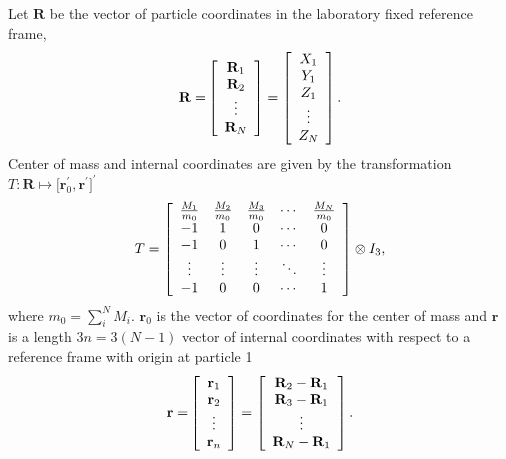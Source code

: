 \documentclass[12pt]{article}
\begin{document}
Let $\mathbf{R}$ be the vector of particle coordinates in the laboratory fixed
reference frame,
\begin{equation}
\mathbf{R=}\left[
\begin{array}
[c]{c}%
\mathbf{R}_{1}\\
\mathbf{R}_{2}\\
\vdots\\
\mathbf{R}_{N}%
\end{array}
\right]  =\left[
\begin{array}
[c]{c}%
X_{1}\\
Y_{1}\\
Z_{1}\\
\vdots\\
Z_{N}%
\end{array}
\right]  .
\end{equation}
Center of mass and internal coordinates are given by the transformation
$T:\mathbf{R}\mapsto\lbrack\mathbf{r}_{0}^{\prime},\mathbf{r}^{\prime
}]^{\prime}$
\begin{equation}
T=\left[
\begin{array}
[c]{ccccc}%
\frac{M_{1}}{m_{0}} & \frac{M_{2}}{m_{0}} & \frac{M_{3}}{m_{0}} & \cdots &
\frac{M_{N}}{m_{0}}\\
-1 & 1 & 0 & \cdots & 0\\
-1 & 0 & 1 & \cdots & 0\\
\vdots & \vdots & \vdots & \ddots & \vdots\\
-1 & 0 & 0 & \cdots & 1
\end{array}
\right]  \otimes I_{3},\label{Ttran}%
\end{equation}
where $m_{0}=\sum_{i}^{N}M_{i}$. $\mathbf{r}_{0}$ is the vector of coordinates
for the center of mass and $\mathbf{r}$ is a length $3n=3\left(  N-1\right)  $
vector of internal coordinates with respect to a reference frame with origin
at particle 1
\begin{equation}
\mathbf{r=}\left[
\begin{array}
[c]{c}%
\mathbf{r}_{1}\\
\mathbf{r}_{2}\\
\vdots\\
\mathbf{r}_{n}%
\end{array}
\right]  =\left[
\begin{array}
[c]{c}%
\mathbf{R}_{2}-\mathbf{R}_{1}\\
\mathbf{R}_{3}-\mathbf{R}_{1}\\
\vdots\\
\mathbf{R}_{N}-\mathbf{R}_{1}%
\end{array}
\right]  .\label{rdef}%
\end{equation}
\end{document}
